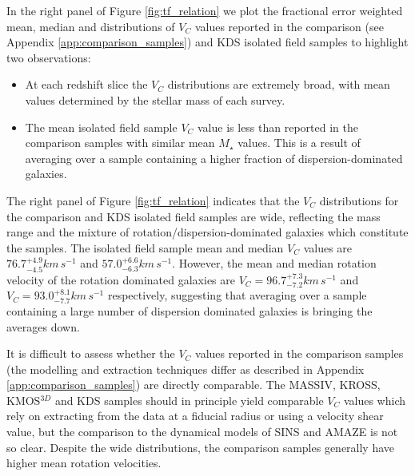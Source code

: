 \documentclass[fleqn,usenatbib]{mnras}
\begin{document}
In the right panel of Figure \ref{fig:tf_relation} we plot the fractional error weighted mean, median and distributions of $V_{C}$ values reported in the comparison (see Appendix \ref{app:comparison_samples}) and KDS isolated field samples to highlight two observations:
\begin{itemize}
    \item At each redshift slice the $V_{C}$ distributions are extremely broad, with mean values determined by the stellar mass of each survey.
    \item The mean isolated field sample $V_{C}$ value is less than reported in the comparison samples with similar mean $M_{\star}$ values.
    This is a result of averaging over a sample containing a higher fraction of dispersion-dominated galaxies.
\end{itemize}

\noindent
The right panel of Figure \ref{fig:tf_relation} indicates that the $V_{C}$ distributions for the comparison and KDS isolated field samples are wide, reflecting the mass range and the mixture of rotation/dispersion-dominated galaxies which constitute the samples.
The isolated field sample mean and median $V_{C}$ values are $76.7^{+4.9}_{-4.5}km\,s^{-1}$ and $57.0^{+6.6}_{-6.3}km\,s^{-1}$.
However, the mean and median rotation velocity of the rotation dominated galaxies are $V_{C} = 96.7^{+7.3}_{-7.2}km\,s^{-1}$ and $V_{C} = 93.0^{+8.1}_{-7.7}km\,s^{-1}$ respectively, suggesting that averaging over a sample containing a large number of dispersion dominated galaxies is bringing the averages down.

It is difficult to assess whether the $V_{C}$ values reported in the comparison samples (the modelling and extraction techniques differ as described in Appendix \ref{app:comparison_samples}) are directly comparable.
The MASSIV, KROSS, KMOS$^{3D}$ and KDS samples should in principle yield comparable $V_{C}$ values which rely on extracting from the data at a fiducial radius or using a velocity shear value, but the comparison to the dynamical models of SINS and AMAZE is not so clear.
Despite the wide distributions, the comparison samples generally have higher mean rotation velocities. \\
\end{document}
